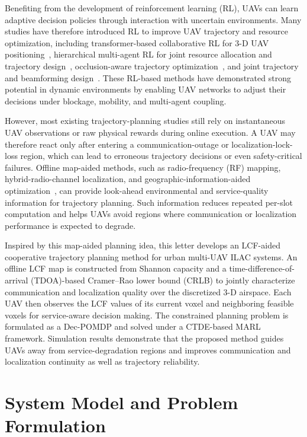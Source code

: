 \documentclass[10pt,journal,letterpaper]{IEEEtran}
\begin{document}
Benefiting from the development of reinforcement learning (RL), UAVs can learn adaptive decision policies through interaction with uncertain environments. Many studies have therefore introduced RL to improve UAV trajectory and resource optimization, including transformer-based collaborative RL for 3-D UAV positioning~\cite{ref10}, hierarchical multi-agent RL for joint resource allocation and trajectory design~\cite{ref9}, occlusion-aware trajectory optimization~\cite{ref11}, and joint trajectory and beamforming design~\cite{ref12}. These RL-based methods have demonstrated strong potential in dynamic environments by enabling UAV networks to adjust their decisions under blockage, mobility, and multi-agent coupling.

However, most existing trajectory-planning studies still rely on instantaneous UAV observations or raw physical rewards during online execution. A UAV may therefore react only after entering a communication-outage or localization-lock-loss region, which can lead to erroneous trajectory decisions or even safety-critical failures. Offline map-aided methods, such as radio-frequency (RF) mapping, hybrid-radio-channel localization, and geographic-information-aided optimization~\cite{ref13,ref14,ref15}, can provide look-ahead environmental and service-quality information for trajectory planning. Such information reduces repeated per-slot computation and helps UAVs avoid regions where communication or localization performance is expected to degrade.

Inspired by this map-aided planning idea, this letter develops an LCF-aided cooperative trajectory planning method for urban multi-UAV ILAC systems. An offline LCF map is constructed from Shannon capacity and a time-difference-of-arrival (TDOA)-based Cramer--Rao lower bound (CRLB) to jointly characterize communication and localization quality over the discretized 3-D airspace. Each UAV then observes the LCF values of its current voxel and neighboring feasible voxels for service-aware decision making. The constrained planning problem is formulated as a Dec-POMDP and solved under a CTDE-based MARL framework. Simulation results demonstrate that the proposed method guides UAVs away from service-degradation regions and improves communication and localization continuity as well as trajectory reliability.

\section{System Model and Problem Formulation} 
\end{document}
